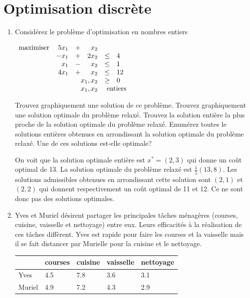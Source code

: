 \section{Optimisation discrète}

\begin{enumerate}

  \item Considérez le problème d'optimisation en nombres entiers

    $
    \begin{array}{lrcrcl}
      \maxi & 5x_1 & +&  x_2\\
      & -x_1 &+& 2 x_2  & \leq & 4 \\
      & x_1    & - &    x_2   &  \leq & 1\\
      &   4x_1& +&  x_2  & \leq & 12 \\
      &   \multicolumn{3}{r}{x_1, x_2}  & \geq & 0\\
      &   \multicolumn{3}{r}{x_1, x_2}  & \multicolumn{2}{l}{\mbox{ entiers}}
    \end{array}
    $

    Trouvez graphiquement une solution de ce problème. Trouvez graphiquement une solution optimale du problème relaxé. Trouvez la
    solution entière la plus proche de la solution optimale du problème relaxé. Enumérez toutes le solutions entières obtenues en
    arrondissant la solution optimale du problème relaxé. Une de ces solutions est-elle optimale?


    \begin{solution}
      On voit que la solution optimale entière est $x^* = (2,3)$ qui donne
      un coût optimal de 13.
      La solution optimale du problème relaxé est $\frac{1}{5}(13,8)$.
      Les solutions admissibles obtenues en arrondissant cette solution
      sont $(2,1)$ et $(2,2)$ qui donnent respectivement un coût optimal de
      11 et 12.
      Ce ne sont donc pas des solutions optimales.
    \end{solution}

  \item Yves et Muriel désirent partager les principales tâches ménagères  (courses, cuisine, vaisselle et nettoyage)
    entre eux. Leurs efficacités à la réalisation de ces tâches
    diffèrent. Yves est rapide pour faire les courses et la vaisselle mais il se fait distancer par Murielle pour la cuisine et le
    nettoyage.

    \begin{center}
      \begin{tabular}{l|llll}
        & courses & cuisine & vaisselle & nettoyage\\
        \hline
        Yves & 4.5 & 7.8 & 3.6 & 3.1\\
        Muriel & 4.9 & 7.2 & 4.3 & 2.9
      \end{tabular}
    \end{center}


\end{enumerate}
